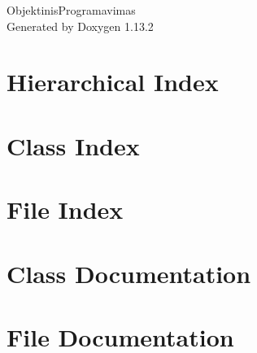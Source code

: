 \documentclass[twoside]{book}
\newcommand{\+}{\discretionary{\mbox{\scriptsize$\hookleftarrow$}}{}{}}
\newcommand{\clearemptydoublepage}{%
    \newpage{\pagestyle{empty}\cleardoublepage}%
  }
\begin{document}
  \raggedbottom
    \hypersetup{pageanchor=false,
                bookmarksnumbered=true,
                pdfencoding=unicode
               }
  \begin{titlepage}
  \vspace*{7cm}
  \begin{center}%
  {\Large Objektinis\+Programavimas}\\
  \vspace*{1cm}
  {\large Generated by Doxygen 1.13.2}\\
  \end{center}
  \end{titlepage}
  \clearemptydoublepage
  \tableofcontents
  \clearemptydoublepage
  \hypersetup{pageanchor=true}

\chapter{Hierarchical Index}

\chapter{Class Index}

\chapter{File Index}

\chapter{Class Documentation}



\chapter{File Documentation}



  \backmatter
  \newpage
  \clearemptydoublepage
  \printindex
\end{document}
